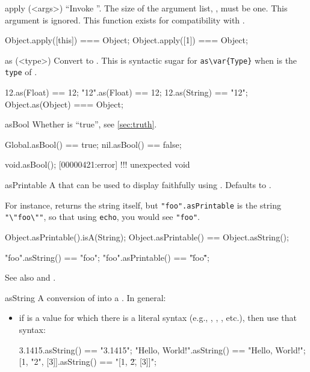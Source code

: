 \begin{urbiscriptapi}
\item[apply](<args>)%
  ``Invoke \this''.  The size of the argument list,
  , must be one.  This argument is ignored.  This function
  exists for compatibility with .
\begin{urbiassert}
Object.apply([this]) === Object;
Object.apply([1])    === Object;
\end{urbiassert}


\item[as](<type>)%
  Convert \this to .  This is syntactic sugar for
  \lstinline|as\var{Type}| when  is the \lstinline|type| of
  .
\begin{urbiassert}
     12.as(Float) == 12;
   "12".as(Float) == 12;
    12.as(String) == "12";
Object.as(Object) === Object;
\end{urbiassert}


\item[asBool]
  Whether \this is ``true'', see \autoref{sec:truth}.
\begin{urbiassert}
Global.asBool() == true;
nil.asBool() ==    false;
\end{urbiassert}

\begin{urbiscript}
void.asBool();
[00000421:error] !!! unexpected void
\end{urbiscript}


\item[asPrintable]%
  A  that can be used to display faithfully \this using
  .  Defaults to .

  For instance,  returns the string itself, but
  \lstinline{"foo".asPrintable} is the string \lstinline{"\"foo\""}, so that
  using \lstinline{echo}, you would see \lstinline{"foo"}.
\begin{urbiassert}
Object.asPrintable().isA(String);
Object.asPrintable() == Object.asString();

"foo".asString() == "foo";
"foo".asPrintable() == "\"foo\"";
\end{urbiassert}

  See also  and .


\item[asString]%
  A conversion of \this into a .  In general:
  \begin{itemize}
  \item if \this is a value for which there is a literal syntax (e.g.,
    , , , etc.), then use
    that syntax:
\begin{urbiassert}
         3.1415.asString() == "3.1415";
"Hello, World!".asString() == "Hello, World!";
  [1, "2", [3]].asString() == "[1, \"2\", [3]]";
\end{urbiassert}


\end{itemize}
\end{urbiscriptapi}
